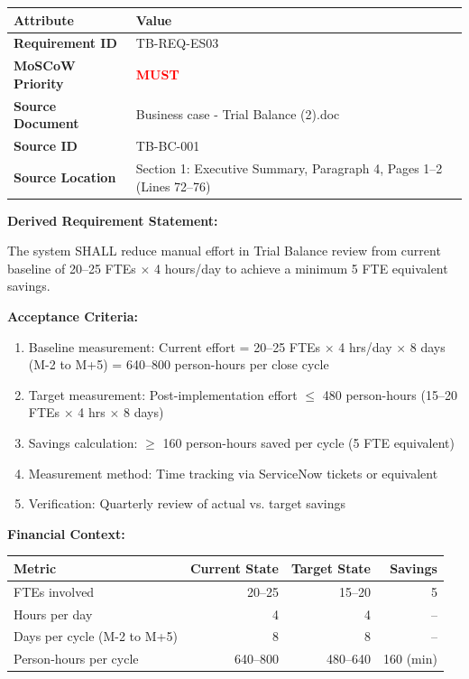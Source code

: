 \begin{tabularx}{\textwidth}{@{}lX@{}}
\toprule
\textbf{Attribute} & \textbf{Value} \\
\midrule
\textbf{Requirement ID} & TB-REQ-ES03 \\
\textbf{MoSCoW Priority} & \textcolor{red}{\textbf{MUST}} \\
\textbf{Source Document} & Business case - Trial Balance (2).doc \\
\textbf{Source ID} & TB-BC-001 \\
\textbf{Source Location} & Section 1: Executive Summary, Paragraph 4, Pages 1--2 (Lines 72--76) \\
\bottomrule
\end{tabularx}

\vspace{0.5em}
\textbf{Derived Requirement Statement:}

The system SHALL reduce manual effort in Trial Balance review from current 
baseline of 20--25 FTEs $\times$ 4 hours/day to achieve a minimum 5 FTE 
equivalent savings.

\textbf{Acceptance Criteria:}

\begin{tcolorbox}[colback=sapamber!5,colframe=sapamber!70,title=Measurable Acceptance Criteria]
\begin{enumerate}[label=AC-ES03-\arabic*:,leftmargin=*]
    \item Baseline measurement: Current effort = 20--25 FTEs $\times$ 4 hrs/day 
          $\times$ 8 days (M-2 to M+5) = 640--800 person-hours per close cycle
    \item Target measurement: Post-implementation effort $\leq$ 480 person-hours 
          (15--20 FTEs $\times$ 4 hrs $\times$ 8 days)
    \item Savings calculation: $\geq$ 160 person-hours saved per cycle (5 FTE equivalent)
    \item Measurement method: Time tracking via ServiceNow tickets or equivalent
    \item Verification: Quarterly review of actual vs. target savings
\end{enumerate}
\end{tcolorbox}

\textbf{Financial Context:}

\begin{tabular}{lrrr}
\toprule
\textbf{Metric} & \textbf{Current State} & \textbf{Target State} & \textbf{Savings} \\
\midrule
FTEs involved & 20--25 & 15--20 & 5 \\
Hours per day & 4 & 4 & -- \\
Days per cycle (M-2 to M+5) & 8 & 8 & -- \\
Person-hours per cycle & 640--800 & 480--640 & 160 (min) \\
\bottomrule
\end{tabular}

